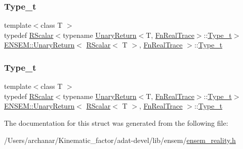 \subsubsection{\texorpdfstring{Type\_t}{Type\_t}\hspace{0.1cm}{\footnotesize\ttfamily [2/3]}}
{\footnotesize\ttfamily template$<$class T $>$ \\
typedef \mbox{\hyperlink{classENSEM_1_1RScalar}{R\+Scalar}}$<$typename \mbox{\hyperlink{structENSEM_1_1UnaryReturn}{Unary\+Return}}$<$T, \mbox{\hyperlink{structENSEM_1_1FnRealTrace}{Fn\+Real\+Trace}}$>$\+::\mbox{\hyperlink{structENSEM_1_1UnaryReturn_3_01RScalar_3_01T_01_4_00_01FnRealTrace_01_4_a686ea10aaa6f33a08566c94481d3e172}{Type\+\_\+t}}$>$ \mbox{\hyperlink{structENSEM_1_1UnaryReturn}{E\+N\+S\+E\+M\+::\+Unary\+Return}}$<$ \mbox{\hyperlink{classENSEM_1_1RScalar}{R\+Scalar}}$<$ T $>$, \mbox{\hyperlink{structENSEM_1_1FnRealTrace}{Fn\+Real\+Trace}} $>$\+::\mbox{\hyperlink{structENSEM_1_1UnaryReturn_3_01RScalar_3_01T_01_4_00_01FnRealTrace_01_4_a686ea10aaa6f33a08566c94481d3e172}{Type\+\_\+t}}}

\mbox{\label{structENSEM_1_1UnaryReturn_3_01RScalar_3_01T_01_4_00_01FnRealTrace_01_4_a686ea10aaa6f33a08566c94481d3e172}} 
\subsubsection{\texorpdfstring{Type\_t}{Type\_t}\hspace{0.1cm}{\footnotesize\ttfamily [3/3]}}
{\footnotesize\ttfamily template$<$class T $>$ \\
typedef \mbox{\hyperlink{classENSEM_1_1RScalar}{R\+Scalar}}$<$typename \mbox{\hyperlink{structENSEM_1_1UnaryReturn}{Unary\+Return}}$<$T, \mbox{\hyperlink{structENSEM_1_1FnRealTrace}{Fn\+Real\+Trace}}$>$\+::\mbox{\hyperlink{structENSEM_1_1UnaryReturn_3_01RScalar_3_01T_01_4_00_01FnRealTrace_01_4_a686ea10aaa6f33a08566c94481d3e172}{Type\+\_\+t}}$>$ \mbox{\hyperlink{structENSEM_1_1UnaryReturn}{E\+N\+S\+E\+M\+::\+Unary\+Return}}$<$ \mbox{\hyperlink{classENSEM_1_1RScalar}{R\+Scalar}}$<$ T $>$, \mbox{\hyperlink{structENSEM_1_1FnRealTrace}{Fn\+Real\+Trace}} $>$\+::\mbox{\hyperlink{structENSEM_1_1UnaryReturn_3_01RScalar_3_01T_01_4_00_01FnRealTrace_01_4_a686ea10aaa6f33a08566c94481d3e172}{Type\+\_\+t}}}



The documentation for this struct was generated from the following file\+:\begin{DoxyCompactItemize}
\item 
/\+Users/archanar/\+Kinematic\+\_\+factor/adat-\/devel/lib/ensem/\mbox{\hyperlink{adat-devel_2lib_2ensem_2ensem__reality_8h}{ensem\+\_\+reality.\+h}}\end{DoxyCompactItemize}
